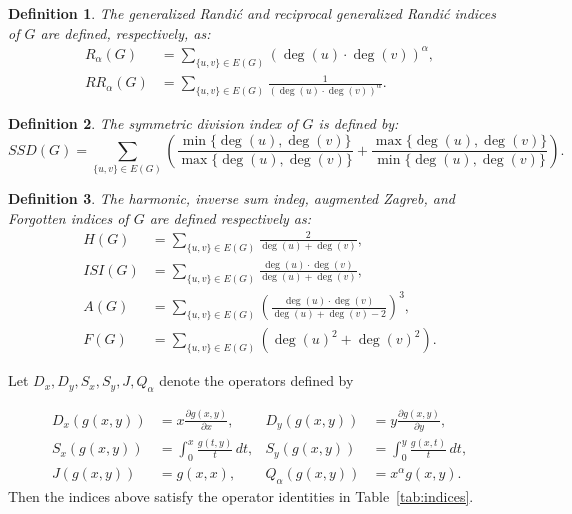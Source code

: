 \documentclass[letterpaper,12pt]{article}
\newtheorem{definition}{Definition}
\begin{document}
\begin{definition}
The \emph{generalized Randić} and \emph{reciprocal generalized Randić} indices of $G$ are defined, respectively, as:
\begin{align}
    R_\alpha(G) &= \sum_{\{u,v\} \in E(G)} \left(\deg(u) \cdot \deg(v)\right)^{\alpha}, \\
    RR_\alpha(G) &= \sum_{\{u,v\} \in E(G)} \frac{1}{\left(\deg(u) \cdot \deg(v)\right)^{\alpha}}.
\end{align}
\end{definition}

\begin{definition}
The \emph{symmetric division index} of $G$ is defined by:
\begin{equation}
    SSD(G) = \sum_{\{u,v\} \in E(G)} \left( \frac{\min\{\deg(u), \deg(v)\}}{\max\{\deg(u), \deg(v)\}} + \frac{\max\{\deg(u), \deg(v)\}}{\min\{\deg(u), \deg(v)\}} \right).
\end{equation}
\end{definition}

\begin{definition}
The \emph{harmonic}, \emph{inverse sum indeg}, \emph{augmented Zagreb}, and \emph{Forgotten} indices of $G$ are defined respectively as:
\begin{align}
    H(G) &= \sum_{\{u,v\} \in E(G)} \frac{2}{\deg(u) + \deg(v)}, \\
    ISI(G) &= \sum_{\{u,v\} \in E(G)} \frac{\deg(u) \cdot \deg(v)}{\deg(u) + \deg(v)}, \\
    A(G) &= \sum_{\{u,v\} \in E(G)} \left( \frac{\deg(u) \cdot \deg(v)}{\deg(u) + \deg(v) - 2} \right)^3, \\
    F(G) &= \sum_{\{u,v\} \in E(G)} \left( \deg(u)^2 + \deg(v)^2 \right).
\end{align}
\end{definition}

Let \(D_x, D_y, S_x, S_y, J, Q_\alpha\) denote the operators defined by

\begin{align*}
    D_x(g(x,y)) &= x \frac{\partial g(x,y)}{\partial x}, & D_y(g(x,y)) &= y \frac{\partial g(x,y)}{\partial y}, \\
    S_x(g(x,y)) &= \int_{0}^{x} \frac{g(t,y)}{t} \, dt, & S_y(g(x,y)) &= \int_{0}^{y} \frac{g(x,t)}{t} \, dt, \\
    J(g(x,y)) &= g(x,x), & Q_\alpha(g(x,y)) &= x^{\alpha} g(x,y).
\end{align*}
Then the indices above satisfy the operator identities in Table~\ref{tab:indices}.
\end{document}
